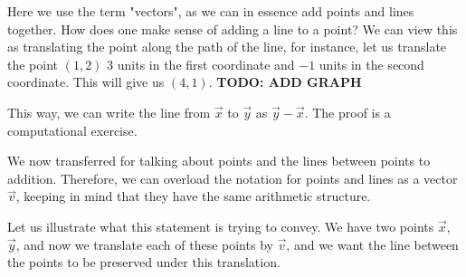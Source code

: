\begin{remark}
	Here we use the term "vectors", as we can in essence add points and lines together. How does one make sense of adding a line to a point? We can view this as translating the point along the path of the line, for instance, let us translate the point $(1,2)$ $3$ units in the first coordinate and $-1$ units in the second coordinate. This will give us $(4,1)$.
 	\textbf{TODO: ADD GRAPH}
\end{remark}
This way, we can write the line from $\vec{x}$ to $\vec{y}$ as $\vec{y}-\vec{x}$. The proof is a computational exercise.
\begin{notation}
	We now transferred for talking about points and the lines between points to addition. Therefore, we can overload the notation for points and lines as a vector $\vec{v}$, keeping in mind that they have the same arithmetic structure.
\end{notation}
Let us illustrate what this statement is trying to convey. We have two points $\vec{x}$, $\vec{y}$, and now we translate each of these points by $\vec{v}$, and we want the line between the points to be preserved under this translation.
 \ \\
